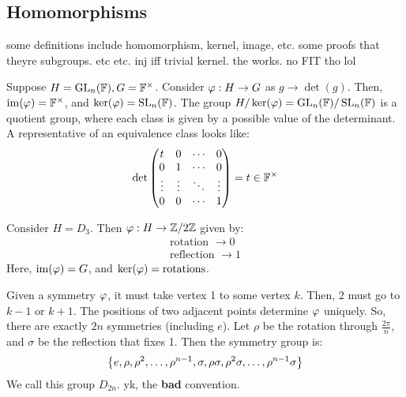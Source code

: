 \subsection{Homomorphisms}


some definitions include homomorphism, kernel, image, etc.
some proofs that theyre subgroups. etc etc.
inj iff trivial kernel. the works. no FIT tho lol

\begin{xmp}[source=Primary Source Material]
    Suppose $ H = \operatorname{GL}_{n}(\mathbb{F}), G = \mathbb{F}^{\times} $.
    Consider $ \operatorname{\varphi} : H \rightarrow G $ as $ g \rightarrow \det(g) $. \vsp
    Then, $ \operatorname{im}(\operatorname{\varphi}) = \mathbb{F}^{\times} $, and $ \ker(\operatorname{\varphi}) = \operatorname{SL}_{n}(\mathbb{F}) $.
    The group $ H/\ker(\operatorname{\varphi}) = \operatorname{GL}_{n}(\mathbb{F})/\operatorname{SL}_{n}(\mathbb{F}) $ is a quotient group,
    where each class is given by a possible value of the determinant.
    A representative of an equivalence class looks like:
    \begin{equation*}
        \det \begin{pmatrix} 
            t & 0 & \cdots & 0 \\ 
            0 & 1 & \cdots & 0 \\ 
        \vdots & \vdots & \ddots & \vdots \\ 
    0 & 0 & \cdots & 1 \end{pmatrix} = t \in \mathbb{F}^{\times}
    \end{equation*}
\end{xmp}

\newpage
\begin{xmp}[source=Primary Source Material]
    Consider $ H = D_{3} $. Then $ \operatorname{\varphi}: H \rightarrow \mathbb{Z}/2\mathbb{Z} $ given by:
    \begin{gather*}
        \textrm{rotation } \rightarrow 0 \\
        \textrm{reflection } \rightarrow 1
    \end{gather*}
    Here, $ \operatorname{im}(\operatorname{\varphi}) = G $, and $ \ker(\operatorname{\varphi}) = \textrm{rotations} $.
\end{xmp}


Given a symmetry $ \operatorname{\varphi} $, it must take vertex 1 to some vertex $ k $.
Then, 2 must go to $ k - 1 $ or $ k+1 $.
The positions of two adjacent points determine $ \operatorname{\varphi} $ uniquely.
So, there are exactly $ 2n $ symmetries (including $ e $). \vsp
%
Let $ \rho $ be the rotation through $ \frac{2\pi}{n} $, and
$ \sigma $ be the reflection that fixes 1.
Then the symmetry group is:
\begin{equation*}
    \left\{{e, \rho, \rho^{2}, \dots, \rho^{n-1},
    \sigma, \rho\sigma, \rho^{2}\sigma, \dots, \rho^{n-1}\sigma}\right\}
\end{equation*}
We call this group $ D_{2n} $. yk, the \textbf{bad} convention.


